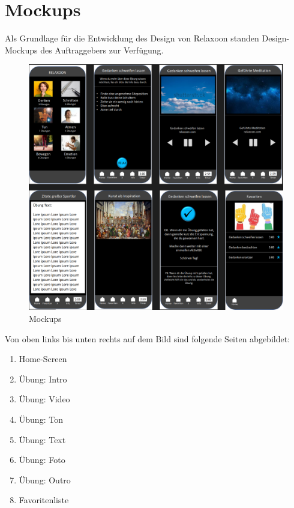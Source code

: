 
\section{Mockups}

Als Grundlage für die Entwicklung des Design von Relaxoon standen Design-Mockups des Auftraggebers zur Verfügung.

\begin{figure}[H]
    \centering
    \includegraphics[height=\textwidth]{./pics/mockups.png}
    \caption{Mockups}
\end{figure}

Von oben links bis unten rechts auf dem Bild sind folgende Seiten abgebildet:

\begin{enumerate}
    \item Home-Screen
    \item Übung: Intro
    \item Übung: Video
    \item Übung: Ton
    \item Übung: Text
    \item Übung: Foto
    \item Übung: Outro
    \item Favoritenliste
\end{enumerate}

